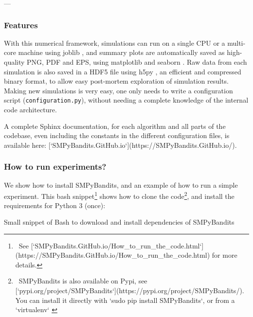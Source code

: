 ---

\subsubsection{Features}

With this numerical framework, simulations can run on a single CPU or a multi-core machine using joblib \cite{joblib},
and summary plots are automatically saved as high-quality PNG, PDF and EPS, using matplotlib \cite{matplotlib} and seaborn \cite{seaborn}.
Raw data from each simulation is also saved in a HDF5 file using h5py \cite{h5py}, an efficient and compressed binary format, to allow easy post-mortem exploration of simulation results.
Making new simulations is very easy, one only needs to write a configuration script (\texttt{configuration.py}), without needing a complete knowledge of the internal code architecture.

A complete Sphinx documentation, for each algorithm and all parts of the codebase, even including the constants in the different configuration files, is available here: [`SMPyBandits.GitHub.io`](https://SMPyBandits.GitHub.io/).

\subsubsection{How to run experiments?}

We show how to install SMPyBandits, and an example of how to run a simple experiment.
This bash snippet\footnote{~See [`SMPyBandits.GitHub.io/How_to_run_the_code.html`](https://SMPyBandits.GitHub.io/How_to_run_the_code.html) for more details.} shows how to clone the code\footnote{~SMPyBandits is also available on Pypi, see [`pypi.org/project/SMPyBandits`](https://pypi.org/project/SMPyBandits/). You can install it directly with `sudo pip install SMPyBandits`, or from a `virtualenv` \cite{virtualenv}},
and install the requirements for Python 3 (once):

\begin{small}
    \begin{listing}[h!]
        \caption{Small snippet of Bash to download and install dependencies of SMPyBandits}
        \label{lst:3:howToInstallLibrary}
    \end{listing}
\end{small}

